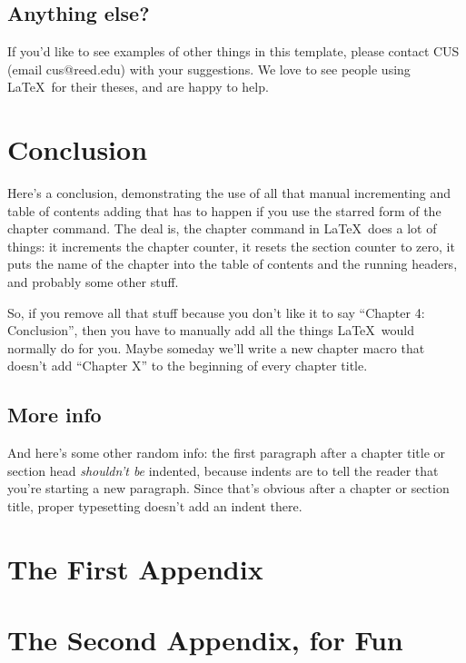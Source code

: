 \documentclass[12pt,twoside]{reedthesis}
\begin{document}
\section{Anything else?}
If you'd like to see examples of other things in this template, please contact CUS (email cus@reed.edu) with your suggestions. We love to see people using \LaTeX\ for their theses, and are happy to help.

\chapter*{Conclusion}
	\setcounter{chapter}{4}
	\setcounter{section}{0}
	
Here's a conclusion, demonstrating the use of all that manual incrementing and table of contents adding that has to happen if you use the starred form of the chapter command. The deal is, the chapter command in \LaTeX\ does a lot of things: it increments the chapter counter, it resets the section counter to zero, it puts the name of the chapter into the table of contents and the running headers, and probably some other stuff. 

So, if you remove all that stuff because you don't like it to say ``Chapter 4: Conclusion'', then you have to manually add all the things \LaTeX\ would normally do for you. Maybe someday we'll write a new chapter macro that doesn't add ``Chapter X'' to the beginning of every chapter title.

\section{More info}
And here's some other random info: the first paragraph after a chapter title or section head \emph{shouldn't be} indented, because indents are to tell the reader that you're starting a new paragraph. Since that's obvious after a chapter or section title, proper typesetting doesn't add an indent there. 


    \appendix
      \chapter{The First Appendix}
      \chapter{The Second Appendix, for Fun}
\end{document}

